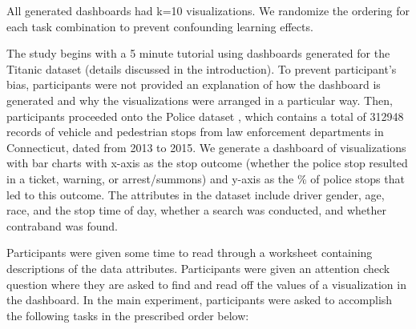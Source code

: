 \begin{enumerate}
\end{enumerate}
All generated dashboards had k=10 visualizations. We randomize the ordering for each task combination to prevent confounding learning effects. 
\par The study begins with a 5 minute tutorial using dashboards generated for the Titanic dataset (details discussed in the introduction). To prevent participant's bias, participants were not provided an explanation of how the dashboard is generated and why the visualizations were arranged in a particular way. Then, participants proceeded onto the Police dataset\cite{police} %
, which contains a total of 312948 records of vehicle and pedestrian stops from law enforcement departments in Connecticut, dated from 2013 to 2015. We generate a dashboard of visualizations with bar charts with x-axis as the stop outcome (whether the police stop resulted in a ticket, warning, or arrest/summons) and y-axis as the \% of police stops that led to this outcome. The attributes in the dataset include driver gender, age, race, and the stop time of day, whether a search was conducted, and whether contraband was found.
\par Participants were given some time to read through a worksheet containing descriptions of the data attributes. Participants were given an attention check question where they are asked to find and read off the values of a visualization in the dashboard. In the main experiment, participants were asked to accomplish the following tasks in the prescribed order below:

